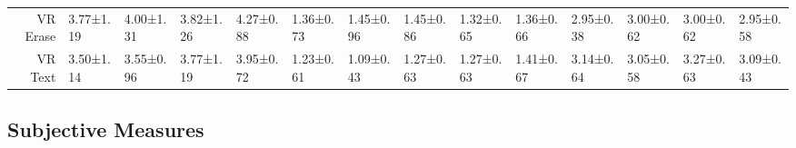 \begin{table*}[b]
\begin{adjustbox}{width=\textwidth}
\begin{tabular}{rlllllllllllll}
VR Erase & 3.77±1.19\cellcolor{lightblue!30} & 4.00±1.31\cellcolor{lightblue!25} & 3.82±1.26\cellcolor{lightblue!29} & 4.27±0.88\cellcolor{lightblue!18} & 1.36±0.73\cellcolor{lightblue!9} & 1.45±0.96\cellcolor{lightblue!11} & 1.45±0.86\cellcolor{lightblue!11} & 1.32±0.65\cellcolor{lightblue!7} & 1.36±0.66\cellcolor{lightblue!9} & 2.95±0.38\cellcolor{lightblue!2} & 3.00±0.62\cellcolor{lightblue!0} & 3.00±0.62\cellcolor{lightblue!0} & 2.95±0.58\cellcolor{lightblue!2} \\
VR Text& 3.50±1.14\cellcolor{lightblue!37} & 3.55±0.96\cellcolor{lightblue!36} & 3.77±1.19\cellcolor{lightblue!30} & 3.95±0.72\cellcolor{lightblue!26} & 1.23±0.61\cellcolor{lightblue!5} & 1.09±0.43\cellcolor{lightblue!2} & 1.27±0.63\cellcolor{lightblue!6} & 1.27±0.63\cellcolor{lightblue!6} & 1.41±0.67\cellcolor{lightblue!10} & 3.14±0.64\cellcolor{lightblue!6} & 3.05±0.58\cellcolor{lightblue!2} & 3.27±0.63\cellcolor{lightblue!13} & 3.09±0.43\cellcolor{lightblue!4} \\
\bottomrule
\end{tabular}
\end{adjustbox}
\end{table*}


\subsection{Subjective Measures}

